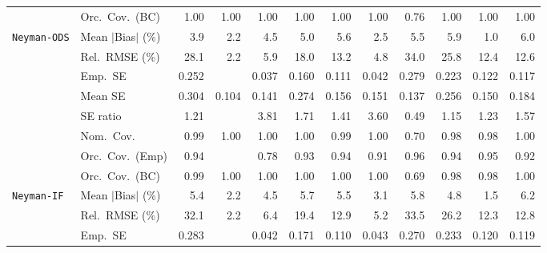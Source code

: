 \begin{landscape}
\begin{longtable}{llrrrrrrrrrr}
 & Orc.\ Cov.\ (BC) & \cellcolor{rankone}1.00 & \cellcolor{rankone}1.00 & \cellcolor{rankone}1.00 & \cellcolor{rankone}1.00 & \cellcolor{rankone}1.00 & \cellcolor{rankone}1.00 & \cellcolor{ranktwo}0.76 & \cellcolor{rankone}1.00 & \cellcolor{rankone}1.00 & \cellcolor{rankone}1.00 \\
\addlinespace[2pt]
\quad \texttt{Neyman-ODS} & Mean $|$Bias$|$ (\%) & 3.9 & \cellcolor{ranktwo}2.2 & 4.5 & 5.0 & 5.6 & \cellcolor{rankthree}2.5 & 5.5 & 5.9 & \cellcolor{rankone}1.0 & 6.0 \\
 & Rel.\ RMSE (\%) & 28.1 & \cellcolor{rankone}2.2 & \cellcolor{rankthree}5.9 & 18.0 & 13.2 & \cellcolor{ranktwo}4.8 & 34.0 & 25.8 & 12.4 & 12.6 \\
 & Emp.\ SE & 0.252 &  & 0.037 & 0.160 & 0.111 & 0.042 & 0.279 & 0.223 & 0.122 & 0.117 \\
 & Mean SE & 0.304 & 0.104 & 0.141 & 0.274 & 0.156 & 0.151 & 0.137 & 0.256 & 0.150 & 0.184 \\
 & SE ratio & \cellcolor{ranktwo}1.21 &  & 3.81 & 1.71 & 1.41 & 3.60 & 0.49 & \cellcolor{rankone}1.15 & \cellcolor{rankthree}1.23 & 1.57 \\
 & Nom.\ Cov. & \cellcolor{ranktwo}0.99 & \cellcolor{rankthree}1.00 & \cellcolor{rankthree}1.00 & \cellcolor{rankthree}1.00 & \cellcolor{ranktwo}0.99 & \cellcolor{rankthree}1.00 & 0.70 & \cellcolor{rankone}0.98 & \cellcolor{rankone}0.98 & \cellcolor{rankthree}1.00 \\
 & Orc.\ Cov.\ (Emp) & \cellcolor{ranktwo}0.94 &  & 0.78 & \cellcolor{rankthree}0.93 & \cellcolor{ranktwo}0.94 & 0.91 & \cellcolor{ranktwo}0.96 & \cellcolor{ranktwo}0.94 & \cellcolor{rankone}0.95 & 0.92 \\
 & Orc.\ Cov.\ (BC) & \cellcolor{ranktwo}0.99 & \cellcolor{rankthree}1.00 & \cellcolor{rankthree}1.00 & \cellcolor{rankthree}1.00 & \cellcolor{rankthree}1.00 & \cellcolor{rankthree}1.00 & 0.69 & \cellcolor{rankone}0.98 & \cellcolor{rankone}0.98 & \cellcolor{rankthree}1.00 \\
\addlinespace[2pt]
\quad \texttt{Neyman-IF} & Mean $|$Bias$|$ (\%) & 5.4 & \cellcolor{ranktwo}2.2 & 4.5 & 5.7 & 5.5 & \cellcolor{rankthree}3.1 & 5.8 & 4.8 & \cellcolor{rankone}1.5 & 6.2 \\
 & Rel.\ RMSE (\%) & 32.1 & \cellcolor{rankone}2.2 & \cellcolor{rankthree}6.4 & 19.4 & 12.9 & \cellcolor{ranktwo}5.2 & 33.5 & 26.2 & 12.3 & 12.8 \\
 & Emp.\ SE & 0.283 &  & 0.042 & 0.171 & 0.110 & 0.043 & 0.270 & 0.233 & 0.120 & 0.119 \\

\end{longtable}
\end{landscape}
